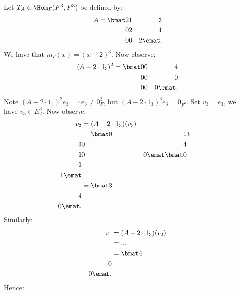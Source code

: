     \begin{example}
        Let $T_A \in \Hom_F{(F^3,F^3)}$ be defined by:
            \begin{equation*}
            \begin{split}
                A = \bmat 2 & 1 & 3  \\ 0 & 2 & 4 \\ 0 & 0 & 2 \emat.
            \end{split}
            \end{equation*}
        We have that $m_T(x) = (x-2)^3$. Now observe:
            \begin{equation*}
            \begin{split}
                (A - 2\cdot 1_3)^2 = \bmat 0 & 0 & 4 \\ 0 & 0 & 0 \\ 0 & 0 & 0 \emat.
            \end{split}
            \end{equation*}
        Note $(A - 2\cdot 1_3)^2 e_3 = 4e_3 \neq 0_F^3$, but $(A - 2 \cdot 1_3)^3 e_3 = 0_{F^3}$. Set $v_3 = e_3$, we have $v_3 \in E_2^3$. Now observe:
            \begin{equation*}
            \begin{split}
                v_2 &= (A - 2 \cdot 1_3)(v_3) \\
                & = \bmat 0 & 1 & 3 \\ 0 & 0 & 4 \\ 0 & 0 & 0 \emat \bmat 0 \\ 0 \\ 1 \emat \\
                & = \bmat 3 \\ 4\\ 0 \emat.
            \end{split}
            \end{equation*}
        Similarly:
            \begin{equation*}
            \begin{split}
                v_1 &= (A - 2 \cdot 1_3)(v_2) \\
                & = ... \\
                & = \bmat 4 \\ 0\\ 0 \emat.
            \end{split}
            \end{equation*}
        Hence:
            \begin{equation*}

\end{equation*}
\end{example}
